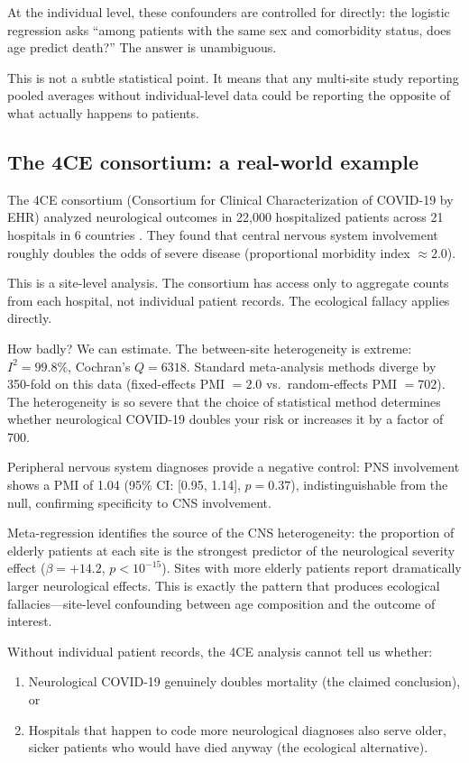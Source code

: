 \documentclass{article}
\begin{document}
At the individual level, these confounders are controlled for directly: the
logistic regression asks ``among patients with the same sex and comorbidity
status, does age predict death?''  The answer is unambiguous.

This is not a subtle statistical point.  It means that any multi-site study
reporting pooled averages without individual-level data could be reporting the
opposite of what actually happens to patients.


\subsection{The 4CE consortium: a real-world example}

The 4CE consortium (Consortium for Clinical Characterization of COVID-19 by
EHR) analyzed neurological outcomes in 22,000 hospitalized patients across 21
hospitals in 6 countries \cite{four_ce_neuro2021}.  They found that central
nervous system involvement roughly doubles the odds of severe disease
(proportional morbidity index $\approx 2.0$).

This is a site-level analysis.  The consortium has access only to aggregate
counts from each hospital, not individual patient records.  The ecological
fallacy applies directly.

How badly?  We can estimate.  The between-site heterogeneity is extreme:
$I^2 = 99.8\%$, Cochran's $Q = 6318$.  Standard meta-analysis methods diverge
by 350-fold on this data (fixed-effects PMI $= 2.0$ vs.\ random-effects PMI
$= 702$).  The heterogeneity is so severe that the choice of statistical
method determines whether neurological COVID-19 doubles your risk or increases
it by a factor of 700.

Peripheral nervous system diagnoses provide a negative control: PNS involvement shows a PMI of 1.04 (95\% CI: [0.95, 1.14], $p = 0.37$), indistinguishable from the null, confirming specificity to CNS involvement.

Meta-regression identifies the source of the CNS heterogeneity: the proportion of elderly patients at
each site is the strongest predictor of the neurological severity effect
($\beta = +14.2$, $p < 10^{-15}$).  Sites with more elderly patients report
dramatically larger neurological effects.  This is exactly the pattern that
produces ecological fallacies---site-level confounding between age composition
and the outcome of interest.

Without individual patient records, the 4CE analysis cannot tell us whether:
\begin{enumerate}
\item Neurological COVID-19 genuinely doubles mortality (the claimed
conclusion), or
\item Hospitals that happen to code more neurological diagnoses also serve
older, sicker patients who would have died anyway (the ecological
alternative).
\end{enumerate}
\end{document}
